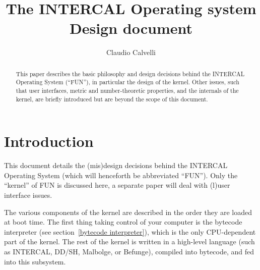 \documentclass[12pt,titlepage,a4paper,twoside]{article}
\title{The INTERCAL Operating system\\Design document}
\author{Claudio Calvelli}
\begin{document}
\pagestyle{myheadings}
\thispagestyle{empty}
\makeatletter
\markboth{\@title}{\@title}
\makeatother
\newlength{\strikesize}
\def\strike#1{\settowidth{\strikesize}{#1}%
\makebox[0pt][l]{\rule[0.3ex]{\strikesize}{0.05ex}}%
\makebox[0pt][l]{\rule[0.5ex]{\strikesize}{0.05ex}}%
\makebox[0pt][l]{\rule[0.7ex]{\strikesize}{0.05ex}}%
#1}

\maketitle
\begin{abstract}
This paper describes the basic philosophy and design decisions behind the
INTERCAL Operating System (``FUN''), in particular the design of the kernel.
Other issues, such that user interfaces, metric and number-theoretic
properties, and the internals of the kernel, are briefly introduced but
are beyond the scope of this document.
\end{abstract}
\clearpage
\setcounter{page}{1}
\tableofcontents



\clearpage



\section{Introduction}
\label{introduction}

This document details the (mis)design decisions behind the INTERCAL Operating
System (which will henceforth be abbreviated ``FUN''). Only the ``kernel'' of
FUN is discussed here, a separate paper will deal with (l)user interface
issues.

The various components of the kernel are described in the order they are
loaded at boot time. The first thing taking control of your
computer is the bytecode interpreter (see section~\ref{bytecode interpreter}),
which is the only CPU-dependent part of the kernel. The rest of the kernel
is written in a high-level language (such as INTERCAL, DD/SH, Malbolge, or
Befunge), compiled into bytecode, and fed into this subsystem.
\end{document}
